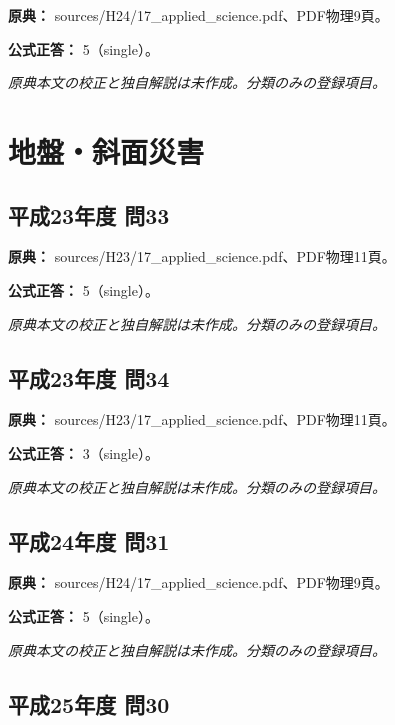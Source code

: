 \noindent\textbf{原典：} sources/H24/17\_applied\_science.pdf、PDF物理9頁。

\textbf{公式正答：} 5（single）。

\par\textit{原典本文の校正と独自解説は未作成。分類のみの登録項目。}

\section{地盤・斜面災害}

\subsection{平成23年度 問33}
\label{q:h23-reg-applied-33}

\noindent\textbf{原典：} sources/H23/17\_applied\_science.pdf、PDF物理11頁。

\textbf{公式正答：} 5（single）。

\par\textit{原典本文の校正と独自解説は未作成。分類のみの登録項目。}

\subsection{平成23年度 問34}
\label{q:h23-reg-applied-34}

\noindent\textbf{原典：} sources/H23/17\_applied\_science.pdf、PDF物理11頁。

\textbf{公式正答：} 3（single）。

\par\textit{原典本文の校正と独自解説は未作成。分類のみの登録項目。}

\subsection{平成24年度 問31}
\label{q:h24-reg-applied-31}

\noindent\textbf{原典：} sources/H24/17\_applied\_science.pdf、PDF物理9頁。

\textbf{公式正答：} 5（single）。

\par\textit{原典本文の校正と独自解説は未作成。分類のみの登録項目。}

\subsection{平成25年度 問30}
\label{q:h25-reg-applied-30}

